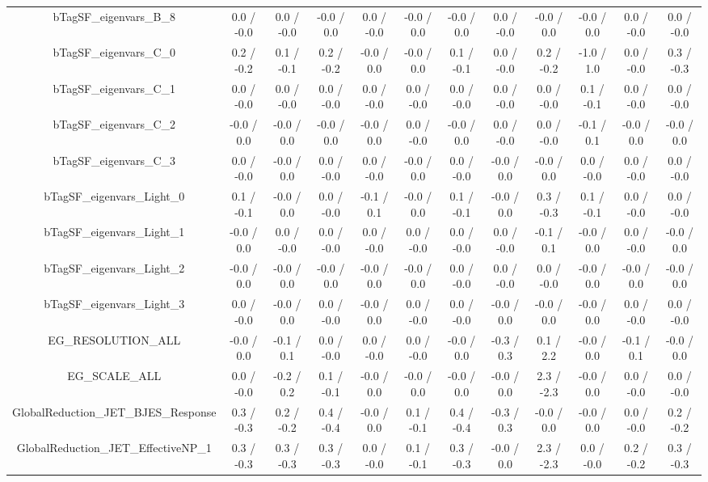 \begin{table}[htbp]
\begin{center}
\begin{tabular}{|c|c|c|c|c|c|c|c|c|c|c|c|}
  bTagSF_eigenvars_B_8 & 0.0 / -0.0 & 0.0 / -0.0 & -0.0 / 0.0 & 0.0 / -0.0 & -0.0 / 0.0 & -0.0 / 0.0 & 0.0 / -0.0 & -0.0 / 0.0 & -0.0 / 0.0 & 0.0 / -0.0 & 0.0 / -0.0 \\ 
  bTagSF_eigenvars_C_0 & 0.2 / -0.2 & 0.1 / -0.1 & 0.2 / -0.2 & -0.0 / 0.0 & -0.0 / 0.0 & 0.1 / -0.1 & 0.0 / -0.0 & 0.2 / -0.2 & -1.0 / 1.0 & 0.0 / -0.0 & 0.3 / -0.3 \\ 
  bTagSF_eigenvars_C_1 & 0.0 / -0.0 & 0.0 / -0.0 & 0.0 / -0.0 & 0.0 / -0.0 & 0.0 / -0.0 & 0.0 / -0.0 & 0.0 / -0.0 & 0.0 / -0.0 & 0.1 / -0.1 & 0.0 / -0.0 & 0.0 / -0.0 \\ 
  bTagSF_eigenvars_C_2 & -0.0 / 0.0 & -0.0 / 0.0 & -0.0 / 0.0 & -0.0 / 0.0 & 0.0 / -0.0 & -0.0 / 0.0 & 0.0 / -0.0 & 0.0 / -0.0 & -0.1 / 0.1 & -0.0 / 0.0 & -0.0 / 0.0 \\ 
  bTagSF_eigenvars_C_3 & 0.0 / -0.0 & -0.0 / 0.0 & 0.0 / -0.0 & 0.0 / -0.0 & -0.0 / 0.0 & 0.0 / -0.0 & -0.0 / 0.0 & -0.0 / 0.0 & 0.0 / -0.0 & 0.0 / -0.0 & 0.0 / -0.0 \\ 
  bTagSF_eigenvars_Light_0 & 0.1 / -0.1 & -0.0 / 0.0 & 0.0 / -0.0 & -0.1 / 0.1 & -0.0 / 0.0 & 0.1 / -0.1 & -0.0 / 0.0 & 0.3 / -0.3 & 0.1 / -0.1 & 0.0 / -0.0 & 0.0 / -0.0 \\ 
  bTagSF_eigenvars_Light_1 & -0.0 / 0.0 & 0.0 / -0.0 & 0.0 / -0.0 & 0.0 / -0.0 & 0.0 / -0.0 & 0.0 / -0.0 & 0.0 / -0.0 & -0.1 / 0.1 & -0.0 / 0.0 & 0.0 / -0.0 & -0.0 / 0.0 \\ 
  bTagSF_eigenvars_Light_2 & -0.0 / 0.0 & -0.0 / 0.0 & -0.0 / 0.0 & -0.0 / 0.0 & -0.0 / 0.0 & 0.0 / -0.0 & 0.0 / -0.0 & 0.0 / -0.0 & -0.0 / 0.0 & -0.0 / 0.0 & -0.0 / 0.0 \\ 
  bTagSF_eigenvars_Light_3 & 0.0 / -0.0 & -0.0 / 0.0 & 0.0 / -0.0 & -0.0 / 0.0 & 0.0 / -0.0 & 0.0 / -0.0 & -0.0 / 0.0 & -0.0 / 0.0 & -0.0 / 0.0 & 0.0 / -0.0 & 0.0 / -0.0 \\ 
  EG_RESOLUTION_ALL & -0.0 / 0.0 & -0.1 / 0.1 & 0.0 / -0.0 & 0.0 / -0.0 & 0.0 / -0.0 & -0.0 / 0.0 & -0.3 / 0.3 & 0.1 / 2.2 & -0.0 / 0.0 & -0.1 / 0.1 & -0.0 / 0.0 \\ 
  EG_SCALE_ALL & 0.0 / -0.0 & -0.2 / 0.2 & 0.1 / -0.1 & -0.0 / 0.0 & -0.0 / 0.0 & -0.0 / 0.0 & -0.0 / 0.0 & 2.3 / -2.3 & -0.0 / 0.0 & 0.0 / -0.0 & 0.0 / -0.0 \\ 
  GlobalReduction_JET_BJES_Response & 0.3 / -0.3 & 0.2 / -0.2 & 0.4 / -0.4 & -0.0 / 0.0 & 0.1 / -0.1 & 0.4 / -0.4 & -0.3 / 0.3 & -0.0 / 0.0 & -0.0 / 0.0 & 0.0 / -0.0 & 0.2 / -0.2 \\ 
  GlobalReduction_JET_EffectiveNP_1 & 0.3 / -0.3 & 0.3 / -0.3 & 0.3 / -0.3 & 0.0 / -0.0 & 0.1 / -0.1 & 0.3 / -0.3 & -0.0 / 0.0 & 2.3 / -2.3 & 0.0 / -0.0 & 0.2 / -0.2 & 0.3 / -0.3 \\ 

\end{tabular}
\end{center}
\end{table}
